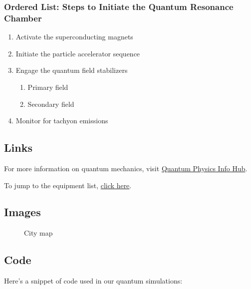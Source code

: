\subsubsection{Ordered List: Steps to Initiate the Quantum Resonance
Chamber}\label{ordered-list-steps-to-initiate-the-quantum-resonance-chamber}

\begin{enumerate}
\def\labelenumi{\arabic{enumi}.}
\tightlist
\item
  Activate the superconducting magnets
\item
  Initiate the particle accelerator sequence
\item
  Engage the quantum field stabilizers

  \begin{enumerate}
  \def\labelenumii{\arabic{enumii}.}
  \tightlist
  \item
    Primary field
  \item
    Secondary field
  \end{enumerate}
\item
  Monitor for tachyon emissions
\end{enumerate}

\subsection{Links}\label{links}

For more information on quantum mechanics, visit
\href{https://example.com/quantum-physics}{Quantum Physics Info Hub}.

To jump to the equipment list,
\hyperref[unordered-list-essential-equipment-for-quantum-experiments]{click
here}.

\subsection{Images}\label{images}

\begin{figure}
\centering
{}
\caption{City map}
\end{figure}

\subsection{Code}\label{code}

Here's a snippet of code used in our quantum simulations:


